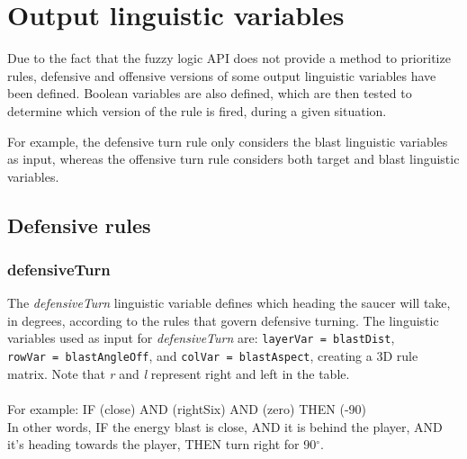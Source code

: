 \section{Output linguistic variables}

Due to the fact that the fuzzy logic API does not provide a method to prioritize rules, defensive and offensive versions of some output linguistic variables have been defined. Boolean variables are also defined, which are then tested to determine which version of the rule is fired, during a given situation.

For example, the defensive turn rule only considers the blast linguistic variables as input, whereas the offensive turn rule considers both target and blast linguistic variables.

\subsection{Defensive rules}

\subsubsection{defensiveTurn}

The \emph{defensiveTurn} linguistic variable defines which heading the saucer will take, in degrees, according to the rules that govern defensive turning. The linguistic variables used as input for \emph{defensiveTurn} are: \texttt{layerVar = blastDist}, \\ \texttt{rowVar = blastAngleOff}, and \texttt{colVar = blastAspect}, creating a 3D rule matrix. Note that \emph{r} and \emph{l} represent right and left in the table.
\\
\\
For example: IF (close) AND (rightSix) AND (zero) THEN (-90) \\
In other words, IF the energy blast is close, AND it is behind the player, AND it's heading towards the player, THEN turn right for 90$^{\circ}$.

